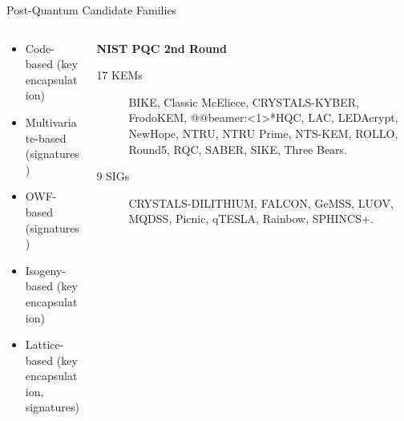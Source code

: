 \documentclass[xcolor=table,10pt,aspectratio=169]{beamer}
\begin{document}
\begin{frame}[label={sec:org107d7e3}]{Post-Quantum Candidate Families}
\begin{columns}[t]
\begin{column}{0.4\columnwidth}
\begin{itemize}
\item \alert<1>{Code-based (key encapsulation)}
\item \alert<2>{Multivariate-based (signatures)}
\item \alert<3>{OWF-based (signatures)}
\item \alert<4>{Isogeny-based (key encapsulation)}
\item \alert<5-7>{Lattice-based} (\alert<5,7>{key encapsulation}, \alert<6,7>{signatures})
\end{itemize}
\end{column}

\begin{column}{0.6\columnwidth}
\textbf{NIST PQC 2nd Round}

\begin{description}
\item[{17 KEMs}] \alert<1>{BIKE}, \alert<1>{Classic McEliece}, \alert<5,7>{CRYSTALS-KYBER}, \alert<5,7>{FrodoKEM}, \alert{@@beamer:<1>*HQC}, \alert<5,7>{LAC}, \alert<1>{LEDAcrypt}, \alert<5,7>{NewHope}, \alert<5,7>{NTRU}, \alert<5,7>{NTRU Prime}, \alert<1>{NTS-KEM}, \alert<1>{ROLLO}, \alert<5,7>{Round5}, \alert<1>{RQC}, \alert<5,7>{SABER}, \alert<4>{SIKE}, \alert<5,7>{Three Bears}.

\item[{9 SIGs}] \alert<6,7>{CRYSTALS-DILITHIUM}, \alert<6,7>{FALCON}, \alert<2>{GeMSS}, \alert<2>{LUOV}, \alert<2>{MQDSS}, \alert<3>{Picnic}, \alert<6,7>{qTESLA}, \alert<2>{Rainbow}, \alert<3>{SPHINCS+}.
\end{description}
\end{column}
\end{columns}
\end{frame}
\end{document}
